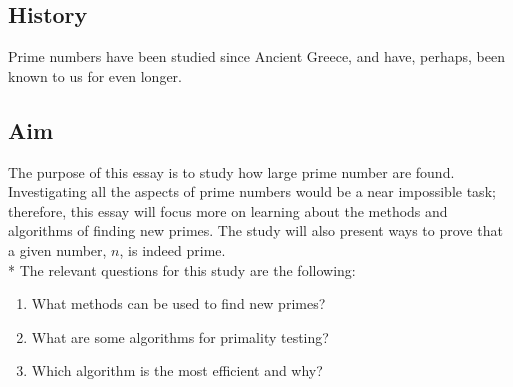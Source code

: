 \documentclass[main.tex]{subfiles}
\begin{document}
\subsection{History}
Prime numbers have been studied since Ancient Greece, and have, perhaps, been known to us for even longer. \cite{prime}

\subsection{Aim}
The purpose of this essay is to study how large prime number are found.
Investigating all the aspects of prime numbers would be a near impossible task;
therefore, this essay will focus more on learning about the methods and
algorithms of finding new primes. The study will also present ways to prove that
a given number, $n$, is indeed prime.
\newline
\\*
The relevant questions for this study are the following:
\begin{enumerate}
    \item What methods can be used to find new primes?
    \item What are some algorithms for primality testing?
    \item Which algorithm is the most efficient and why?
\end{enumerate}
\end{document}
